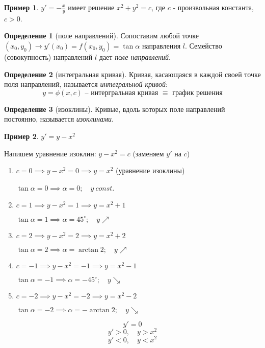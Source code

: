 \documentclass[11pt,a4paper,oneside]{report}
\theoremstyle{definition}
\newtheorem{definition}{Определение}[section]
\newtheorem{example}{Пример}
\theoremstyle{plain}
\theoremstyle{remark}
\begin{document}
\begin{example}
    $y' = - \frac{x}{y}$ имеет решение $x^2 + y^2 = c$, где $c$ - произвольная константа, $c > 0$.
\end{example}

\begin{definition}[поле направлений]
    Сопоставим любой точке $(x_0,y_0) \rightarrow y'(x_0) = f(x_0,y_0) = \tan\alpha$ направления $l$. Семейство (совокупность) направлений $l$ дает \emph{поле направлений}.
\end{definition}

\begin{definition}[интегральная кривая]
    Кривая, касающаяся в каждой своей точке поля направлений, называется \emph{интегральной кривой}:
    \begin{equation*}
        y = \phi(x,c)\text{ -- интергральная кривая }\equiv\text{ график решения}
    \end{equation*}
\end{definition}

\begin{definition}[изоклины]
    Кривые, вдоль которых поле направлений постоянно, называется \emph{изоклинами}.
\end{definition}

\begin{example}
    $y' = y-x^2$

    Напишем уравнение изоклин: $y-x^2 = c$ (заменяем $y'$ на $c$)
    \begin{enumerate}
        \item $c=0 \implies y-x^2 = 0 \implies y=x^2$ (уравнение изоклины)

              $\tan \alpha = 0 \implies \alpha = 0; \quad y \ const$.
        \item $c=1 \implies y-x^2 = 1 \implies y=x^2 + 1$

              $\tan \alpha = 1 \implies \alpha = 45^{\circ}; \quad y\nearrow$
        \item $c=2 \implies y-x^2 = 2 \implies y=x^2 + 2$

              $\tan \alpha = 2 \implies \alpha = \arctan 2; \quad y\nearrow$
        \item $c=-1 \implies y-x^2 = -1 \implies y=x^2 - 1$

              $\tan \alpha = -1 \implies \alpha = -45^{\circ}; \quad y\searrow$
        \item $c=-2 \implies y-x^2 = -2 \implies y=x^2 - 2$

              $\tan \alpha = -2 \implies \alpha = -\arctan 2; \quad y\searrow$
    \end{enumerate}
    \begin{equation*}
        y' = 0
    \end{equation*}
    \begin{equation*}
        y' > 0, \quad y > x^2
    \end{equation*}
    \begin{equation*}
        y' < 0, \quad y < x^2
    \end{equation*}
\end{example}
\end{document}
